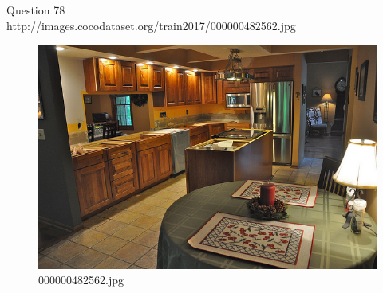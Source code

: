 Question 78\\
http://images.cocodataset.org/train2017/000000482562.jpg
\begin{figure}[h]
    \centering
    \includegraphics[width=0.8\linewidth]{../image set/hard/000000482562.jpg}
    \caption{000000482562.jpg}
\end{figure}
